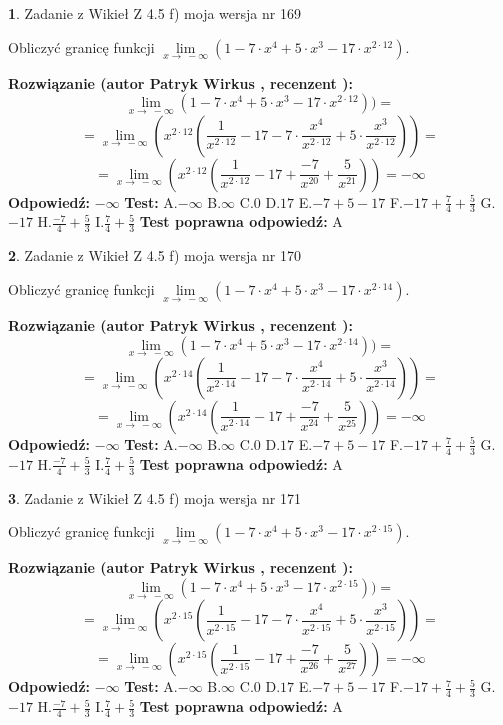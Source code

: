 \documentclass[12pt, a4paper]{article}
\theoremstyle{definition} %
\newtheorem{zad}{}
\newcommand{\zadStart}[1]{\begin{zad}#1\newline}
\newcommand{\zadStop}{\end{zad}}
\newcommand{\rozwStart}[2]{\noindent \textbf{Rozwiązanie (autor #1 , recenzent #2): }\newline}
\newcommand{\rozwStop}{\newline}
\newcommand{\odpStart}{\noindent \textbf{Odpowiedź:}\newline}
\newcommand{\odpStop}{\newline}
\newcommand{\testStart}{\noindent \textbf{Test:}\newline}
\newcommand{\testStop}{\newline}
\newcommand{\kluczStart}{\noindent \textbf{Test poprawna odpowiedź:}\newline}
\newcommand{\kluczStop}{\newline}
\begin{document}
\zadStart{Zadanie z Wikieł Z 4.5 f) moja wersja nr 169}



Obliczyć granicę funkcji  $\lim\limits_{x\to\ -\infty}(1 - 7 \cdot x^{4}+5 \cdot x^{3}- 17 \cdot x^{2\cdot12})$.
\zadStop
\rozwStart{Patryk Wirkus}{}
$$\lim\limits_{x\to\ -\infty}(1 - 7 \cdot x^{4}+5 \cdot x^{3}- 17 \cdot x^{2\cdot12}))=$$
$$=\lim\limits_{x\to\ -\infty}(x^{2\cdot12}(\frac{1}{x^{2\cdot12}}-17 -7 \cdot \frac{x^{4}}{x^{2\cdot12}}+5 \cdot \frac{x^{3}}{x^{2\cdot12}}))=$$
$$=\lim\limits_{x\to\ -\infty}(x^{2\cdot12}(\frac{1}{x^{2\cdot12}}-17 + \frac{-7}{x^{20}}+ \frac{5}{x^{21}}))=-\infty$$
\rozwStop
\odpStart
$-\infty$
\odpStop
\testStart
A.$-\infty$ B.$\infty$ C.$0$ D.$17$ E.$-7 + 5 - 17$
F.$-17+\frac{7}{4}+\frac{5}{3}$ G.$-17$
H.$\frac{-7}{4}+\frac{5}{3}$
I.$\frac{7}{4}+\frac{5}{3}$
\testStop
\kluczStart
A
\kluczStop



\zadStart{Zadanie z Wikieł Z 4.5 f) moja wersja nr 170}



Obliczyć granicę funkcji  $\lim\limits_{x\to\ -\infty}(1 - 7 \cdot x^{4}+5 \cdot x^{3}- 17 \cdot x^{2\cdot14})$.
\zadStop
\rozwStart{Patryk Wirkus}{}
$$\lim\limits_{x\to\ -\infty}(1 - 7 \cdot x^{4}+5 \cdot x^{3}- 17 \cdot x^{2\cdot14}))=$$
$$=\lim\limits_{x\to\ -\infty}(x^{2\cdot14}(\frac{1}{x^{2\cdot14}}-17 -7 \cdot \frac{x^{4}}{x^{2\cdot14}}+5 \cdot \frac{x^{3}}{x^{2\cdot14}}))=$$
$$=\lim\limits_{x\to\ -\infty}(x^{2\cdot14}(\frac{1}{x^{2\cdot14}}-17 + \frac{-7}{x^{24}}+ \frac{5}{x^{25}}))=-\infty$$
\rozwStop
\odpStart
$-\infty$
\odpStop
\testStart
A.$-\infty$ B.$\infty$ C.$0$ D.$17$ E.$-7 + 5 - 17$
F.$-17+\frac{7}{4}+\frac{5}{3}$ G.$-17$
H.$\frac{-7}{4}+\frac{5}{3}$
I.$\frac{7}{4}+\frac{5}{3}$
\testStop
\kluczStart
A
\kluczStop



\zadStart{Zadanie z Wikieł Z 4.5 f) moja wersja nr 171}



Obliczyć granicę funkcji  $\lim\limits_{x\to\ -\infty}(1 - 7 \cdot x^{4}+5 \cdot x^{3}- 17 \cdot x^{2\cdot15})$.
\zadStop
\rozwStart{Patryk Wirkus}{}
$$\lim\limits_{x\to\ -\infty}(1 - 7 \cdot x^{4}+5 \cdot x^{3}- 17 \cdot x^{2\cdot15}))=$$
$$=\lim\limits_{x\to\ -\infty}(x^{2\cdot15}(\frac{1}{x^{2\cdot15}}-17 -7 \cdot \frac{x^{4}}{x^{2\cdot15}}+5 \cdot \frac{x^{3}}{x^{2\cdot15}}))=$$
$$=\lim\limits_{x\to\ -\infty}(x^{2\cdot15}(\frac{1}{x^{2\cdot15}}-17 + \frac{-7}{x^{26}}+ \frac{5}{x^{27}}))=-\infty$$
\rozwStop
\odpStart
$-\infty$
\odpStop
\testStart
A.$-\infty$ B.$\infty$ C.$0$ D.$17$ E.$-7 + 5 - 17$
F.$-17+\frac{7}{4}+\frac{5}{3}$ G.$-17$
H.$\frac{-7}{4}+\frac{5}{3}$
I.$\frac{7}{4}+\frac{5}{3}$
\testStop
\kluczStart
A
\kluczStop
\end{document}
